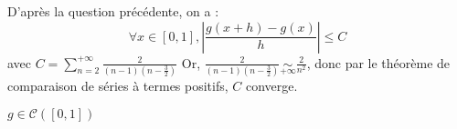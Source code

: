 D'après la question précédente, on a :
\[
  \forall x \in [0, 1], \left|\frac{g(x+h)-g(x)}{h}\right| \leq C
\]
avec
$
  C = \sum\limits_{n=2}^{+\infty}
  \frac{2}{
    \left(
    n-1
    \right)
    \left(
    n-\frac{3}{2}
    \right)}
$
Or, $\frac{2}{\left(n-1\right)\left(n-\frac{3}{2}\right)} \underset{+\infty}{\sim} \frac{2}{n^2}$, donc par le théorème de comparaison de séries à termes positifs, $C$ converge.
\begin{result}
  $g\in\mathcal{C}([0, 1])$
\end{result}
